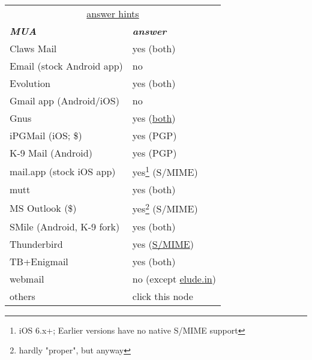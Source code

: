 \documentclass[12pt]{scrartcl}
\begin{document}
\begin{preview}
  \fontsize{4mm}{4mm}\selectfont 
  \begin{minipage}{6cm} %
    \begin{tabular}{lp{26mm}}
      \multicolumn{2}{|c|}{\underline{answer hints}}\\
      \textsl{\textbf{MUA}}          & \textsl{\textbf{answer}}\\
      Claws Mail                     & yes (both)\\
      Email \tiny(stock Android app) & no\\
      Evolution                      & yes (both)\\
      Gmail app \tiny(Android/iOS)   & no\\
      Gnus                           & yes (\href{https://www.emacswiki.org/emacs/GnusSMIME}{both})\\
      iPGMail \tiny(iOS; \$)         & yes (PGP)\\
      K-9 Mail \tiny(Android)        & yes (PGP)\\
      mail.app \tiny(stock iOS app)  & yes\footnote[$\dagger$]{iOS 6.x+; Earlier versions have no native S/MIME support} (S/MIME)\\
      mutt                           & yes (both)\\
      MS Outlook (\$)                & yes\footnote[$\star$]{hardly "proper", but anyway} (S/MIME)\\
      SMile \tiny(Android, K-9 fork) & yes (both)\\
      Thunderbird                    & yes (\href{http://kb.mozillazine.org/Installing_an_SMIME_certificate}{S/MIME})\\
      TB+Enigmail                    & yes (both)\\
      webmail                        & no \tiny(except \href{eludemaillhqfkh5.onion}{elude.in})\\
      others                         & click this node\\
    \end{tabular}
  \end{minipage}
\end{preview}
\end{document}

